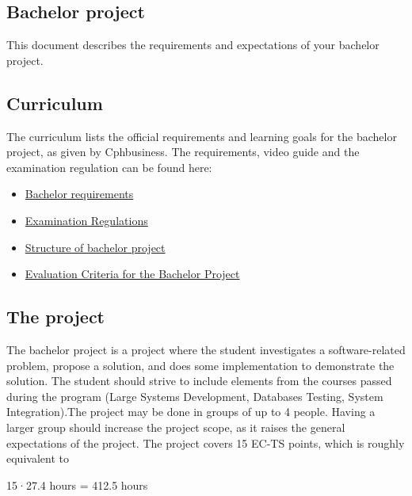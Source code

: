 \subsection{Bachelor project}

This document describes the requirements and expectations of your bachelor project.

\subsection{Curriculum}
The curriculum lists the official requirements and learning goals for the bachelor project, as given by Cphbusiness.  
\newline
The requirements, video guide and the examination regulation can be found here:


\begin{itemize}
    \item[] \href{https://www.cphbusiness.dk/media/78341/pbasoftcbastudieordning2017.pdf}{Bachelor requirements}
    \item[] \href{https://www.cphbusiness.dk/media/81380/examination-regulations-cphbusiness-2021.pdf}{Examination Regulations}
    \item[] \href{https://cphbusiness.cloud.panopto.eu/Panopto/Pages/Viewer.aspx?id=38f9e1bf-333f-44d7-a47b-a85e00bcbc5d&query=data20science}{Structure of bachelor project}
    \item[] \href{https://cphbusiness.cloud.panopto.eu/Panopto/Pages/Viewer.aspx?id=7899543a-eddd-49b9-9ffc-a85e00c1a56e&query=data20science}{Evaluation Criteria for the Bachelor Project}
\end{itemize}

\subsection{The project}
The bachelor project is a project where the student investigates a software-related problem, propose a solution, and does some implementation to demonstrate the solution. The student should strive to  include elements from the courses passed during the program (Large Systems Development, Databases Testing, System Integration).The project may be done in groups of up to 4 people. Having a larger group should increase the project scope, as it raises the general expectations of the project. The project covers 15 EC-TS points, which is roughly equivalent to 
\begin{center}15·27.4 hours = 412.5 hours\end{center}

